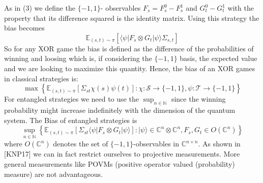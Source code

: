 As in (3) we define the $\{ -1, 1 \}$- observables $F_s = F_s^0 - F_s^1$ and $G_t^0-G_t^1$ with the property that its difference squared is the identity matrix. Using this strategy the bias becomes 
\begin{equation}
\mathbb{E}_{(s,t) \sim \pi} \left[ \langle \psi \vert F_s \otimes G_t \vert \psi \rangle \Sigma_{s,t} \right]
\end{equation}
So for any XOR game the bias is defined as the difference of the probabilities of winning and loosing which is, if considering the $\{ -1, 1 \}$ basis, the expected value and we are looking to maximize this quantity. Hence, the bias of an XOR games in classical strategies is: 
\begin{equation}
\max \left\lbrace \mathbb{E}_{(s,t) \sim \pi} \left[ \Sigma_{st} \chi (s) \psi (t) \right] : \chi : \mathcal{S} \rightarrow \{ -1, 1 \}, \psi : \mathcal{T} \rightarrow \{-1, 1 \} \right\rbrace
\end{equation} 
For entangled strategies we need to use the $\sup_{n \in \mathbb{N}}$ since the winning probability might increase indefinitely with the dimension of the quantum system. 
The Bias of entangled strategies is 
\begin{equation}
\sup_{n \in \mathbb{N}} \left\lbrace \mathbb{E}_{(s,t) \sim \pi} \left[ \Sigma_{st} \langle \psi \vert F_s \otimes G_t \vert \psi \rangle \right] : \vert \psi \rangle \in \mathbb{C}^{n} \otimes \mathbb{C}^{n} , F_s, G_t \in O(\mathbb{C}^n) \right\rbrace
\end{equation}
where $O(\mathbb{C}^n)$ denotes the set of $\{ -1, 1 \}$-observables in $\mathbb{C}^{n \times n}$. As shown in [KNP17] we can in fact restrict ourselves to projective measurements. More general measurements like POVMs (positive operator valued (probability) measure) are not advantageous. 

